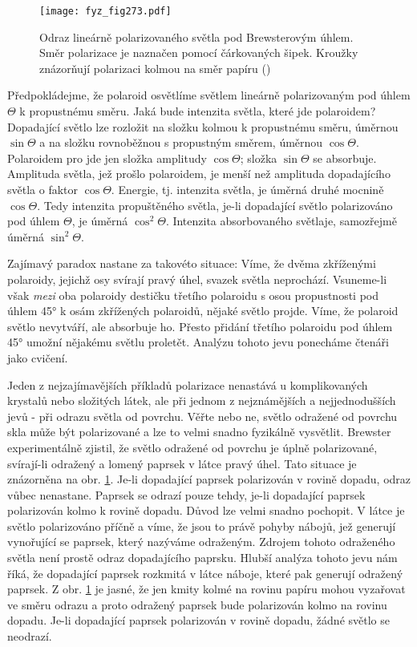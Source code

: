     \begin{figure}[ht!] %
      \centering
      \texttt{[image: fyz\_fig273.pdf]}
      \caption{Odraz lineárně polarizovaného světla pod Brewsterovým úhlem. Směr polarizace je
               naznačen pomocí čárkovaných šipek. Kroužky znázorňují polarizaci kolmou na směr
               papíru (\cite[s.~427]{Feynman01})}
      \label{fyz:fig273}
    \end{figure}

    Předpokládejme, že polaroid osvětlíme světlem lineárně polarizovaným pod úhlem \(\varTheta\) k
    propustnému směru. Jaká bude intenzita světla, které jde polaroidem? Dopadající světlo lze
    rozložit na složku kolmou k propustnému směru, úměrnou \(\sin\varTheta\) a na složku rovnoběžnou
    s propustným směrem, úměrnou \(\cos\varTheta\). Polaroidem pro jde jen složka amplitudy
    \(\cos\varTheta\); složka \(\sin\varTheta\) se absorbuje. Amplituda světla, jež prošlo
    polaroidem, je menší než amplituda dopadajícího světla o faktor \(\cos\varTheta\). Energie, tj.
    intenzita světla, je úměrná druhé mocnině \(\cos\varTheta\). Tedy intenzita propuštěného světla,
    je-li dopadající světlo polarizováno pod úhlem \(\varTheta\), je úměrná \(\cos^2\varTheta\).
    Intenzita absorbovaného světlaje, samozřejmě úměrná \(\sin^2\varTheta\).

    Zajímavý paradox nastane za takovéto situace: Víme, že dvěma zkříženými polaroidy, jejichž osy
    svírají pravý úhel, svazek světla neprochází. Vsuneme-li však \emph{mezi} oba polaroidy destičku
    třetího polaroidu s osou propustnosti pod úhlem \ang{45} k osám zkřížených polaroidů, nějaké
    světlo projde. Víme, že polaroid světlo nevytváří, ale absorbuje ho. Přesto přidání třetího
    polaroidu pod úhlem \ang{45} umožní nějakému světlu proletět. Analýzu tohoto jevu ponecháme
    čtenáři jako cvičení.

    Jeden z nejzajímavějších příkladů polarizace nenastává u komplikovaných krystalů nebo složitých
    látek, ale při jednom z nejznámějších a nejjednodušších jevů - při odrazu světla od povrchu.
    Věřte nebo ne, světlo odražené od povrchu skla může být polarizované a lze to velmi snadno
    fyzikálně vysvětlit. Brewster experimentálně zjistil, že světlo odražené od povrchu je úplně
    polarizované, svírají-li odražený a lomený paprsek v látce pravý úhel. Tato situace je
    znázorněna na obr. \ref{fyz:fig273}. Je-li dopadající paprsek polarizován v rovině dopadu, odraz
    vůbec nenastane. Paprsek se odrazí pouze tehdy, je-li dopadající paprsek polarizován kolmo k
    rovině dopadu. Důvod lze velmi snadno pochopit. V látce je světlo polarizováno příčně a víme, že
    jsou to právě pohyby nábojů, jež generují vynořující se paprsek, který nazýváme odraženým.
    Zdrojem tohoto odraženého světla není prostě odraz dopadajícího paprsku. Hlubší analýza tohoto
    jevu nám říká, že dopadající paprsek rozkmitá v látce náboje, které pak generují odražený
    paprsek. Z obr. \ref{fyz:fig273} je jasné, že jen kmity kolmé na rovinu papíru mohou vyzařovat
    ve směru odrazu a proto odražený paprsek bude polarizován kolmo na rovinu dopadu. Je-li
    dopadající paprsek polarizován v rovině dopadu, žádné světlo se neodrazí.

